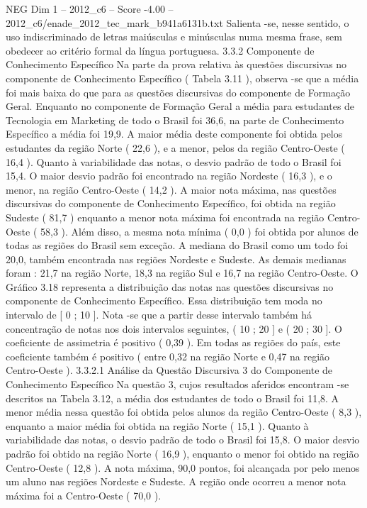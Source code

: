 \begin{textsample}{NEG Dim 1 – 2012\_c6 – Score -4.00 – 2012\_c6/enade\_2012\_tec\_mark\_b941a6131b.txt}
Salienta -se, nesse sentido, o uso indiscriminado de letras maiúsculas e minúsculas numa mesma frase, sem obedecer ao critério formal da língua portuguesa. 3.3.2 Componente de Conhecimento Específico Na parte da prova relativa às questões discursivas no componente de Conhecimento Específico ( Tabela 3.11 ), observa -se que a média foi mais baixa do que para as questões discursivas do componente de Formação Geral.
Enquanto no componente de Formação Geral a média para estudantes de Tecnologia em Marketing de todo o Brasil foi 36,6, na parte de Conhecimento Específico a média foi 19,9.
A maior média deste componente foi obtida pelos estudantes da região Norte ( 22,6 ), e a menor, pelos da região Centro-Oeste ( 16,4 ).
Quanto à variabilidade das notas, o desvio padrão de todo o Brasil foi 15,4.
O maior desvio padrão foi encontrado na região Nordeste ( 16,3 ), e o menor, na região Centro-Oeste ( 14,2 ).
A maior nota máxima, nas questões discursivas do componente de Conhecimento Específico, foi obtida na região Sudeste ( 81,7 ) enquanto a menor nota máxima foi encontrada na região Centro-Oeste ( 58,3 ).
Além disso, a mesma nota mínima ( 0,0 ) foi obtida por alunos de todas as regiões do Brasil sem exceção.
A mediana do Brasil como um todo foi 20,0, também encontrada nas regiões Nordeste e Sudeste.
As demais medianas foram : 21,7 na região Norte, 18,3 na região Sul e 16,7 na região Centro-Oeste.
O Gráfico 3.18 representa a distribuição das notas nas questões discursivas no componente de Conhecimento Específico.
Essa distribuição tem moda no intervalo de [ 0 ; 10 ].
Nota -se que a partir desse intervalo também há concentração de notas nos dois intervalos seguintes, ( 10 ; 20 ] e ( 20 ; 30 ].
O coeficiente de assimetria é positivo ( 0,39 ).
Em todas as regiões do país, este coeficiente também é positivo ( entre 0,32 na região Norte e 0,47 na região Centro-Oeste ). 3.3.2.1 Análise da Questão Discursiva 3 do Componente de Conhecimento Específico Na questão 3, cujos resultados aferidos encontram -se descritos na Tabela 3.12, a média dos estudantes de todo o Brasil foi 11,8.
A menor média nessa questão foi obtida pelos alunos da região Centro-Oeste ( 8,3 ), enquanto a maior média foi obtida na região Norte ( 15,1 ).
Quanto à variabilidade das notas, o desvio padrão de todo o Brasil foi 15,8.
O maior desvio padrão foi obtido na região Norte ( 16,9 ), enquanto o menor foi obtido na região Centro-Oeste ( 12,8 ).
A nota máxima, 90,0 pontos, foi alcançada por pelo menos um aluno nas regiões Nordeste e Sudeste.
A região onde ocorreu a menor nota máxima foi a Centro-Oeste ( 70,0 ).

\end{textsample}

